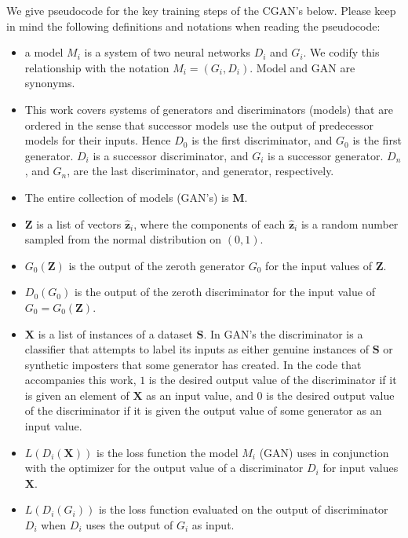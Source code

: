 \documentclass[conference]{IEEEtran}
\begin{document}
We give pseudocode for the key training steps of the CGAN's below.  Please 
keep in mind the following definitions and notations when reading the pseudocode:
\begin{itemize}
\item a model $M_{i}$ is a system of two neural networks $D_{i}$ and $G_{i}$. We
codify this relationship with the notation $M_{i}=\left(G_{i},D_{i}\right)$.
Model and GAN are synonyms.
\item This work covers systems of generators and discriminators (models) that
are ordered in the sense that successor models use the output of predecessor
models for their inputs.  Hence $D_{0}$ is the first discriminator, and $G_{0}$
is the first generator.  $D_{i}$ is a successor discriminator, and $G_{i}$ is
a successor generator. $D_{n}$, and $G_{n}$, are the last discriminator, and
generator, respectively.
\item The entire collection of models (GAN's) is $\mathbf{M}$.
\item $\mathbf{Z}$ is a list of vectors $\hat{\mathbf{z}}_{i}$, where the components 
of each $\hat{\mathbf{z}}_{i}$ is a random number sampled from the normal 
distribution on $\left(0,1\right)$.
\item $G_{0}\left(\mathbf{Z}\right)$ is the output of the zeroth generator
$G_{0}$ for the input values of $\mathbf{Z}$.
\item $D_{0}\left(G_{0}\right)$ is the output of the zeroth discriminator for
the input value of $G_{0} = G_{0}\left(\mathbf{Z}\right)$.
\item $\mathbf{X}$ is a list of instances of a dataset $\mathbf{S}$.  In GAN's the
discriminator is a classifier that attempts to label its inputs as either
genuine instances of $\mathbf{S}$ or synthetic imposters that some generator has
created.  In the code that accompanies this work, $1$ is the desired
output value of the discriminator if it is given an element of $\mathbf{X}$ as
an input value, and $0$ is the desired output value of the discriminator if it
is given the output value of some generator as an input value.
\item $L\left(D_{i}\left(\mathbf{X}\right)\right)$ is the loss function the
model $M_{i}$ (GAN) uses in conjunction with the optimizer for the output value of a 
discriminator $D_{i}$ for input values $\mathbf{X}$.
\item $L\left(D_{i}\left(G_{i}\right)\right)$ is the loss function evaluated
on the output of discriminator $D_{i}$ when $D_{i}$ uses the output of $G_{i}$
as input.

\end{itemize}
\end{document}

